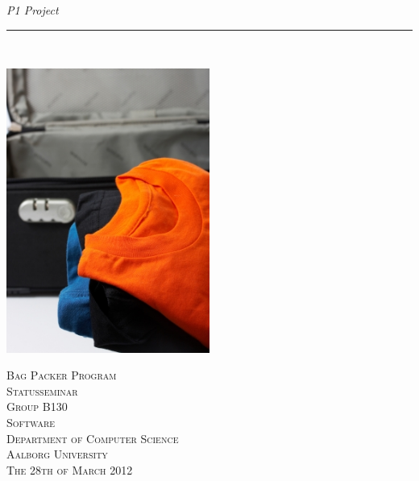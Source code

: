 \thispagestyle{empty}
\begin{flushright}
\vspace{3cm}

\phantom{hul}

\phantom{hul}

\phantom{hul}

\textsl{P1 Project} \\ \vspace{1cm}

\rule{13cm}{3mm} \\ \vspace{1.5cm}
\vspace{1cm}

\includegraphics[width=0.5\textwidth]{billeder/forside.jpg}

\vspace{2cm} 
\textsc{\Large Bag Packer Program \\
Statusseminar\\
Group B130\\
Software\\
Department of Computer Science\\
Aalborg University\\
The 28th of March 2012\\
}
\end{flushright}
